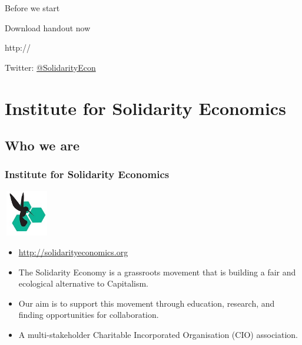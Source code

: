 \begin{frame}{Before we start}
  \begin{center}
    Download handout now

    http://

    Twitter: \href{https://twitter.com/SolidarityEcon}{@SolidarityEcon}
  \end{center}
\end{frame}
\frame{\titlepage}

\frame{\tableofcontents}

\section{Institute for Solidarity Economics}
\subsection{Who we are}
\frame
{
  \frametitle{Institute for Solidarity Economics}
  \begin{center}
    \includegraphics[height=2cm,width=2cm]{ise-logo.jpg}
  \end{center}
  \begin{itemize}
    \item<1-> \url{http://solidarityeconomics.org}
    \item<1-> The Solidarity Economy is a grassroots movement that is building a fair and ecological alternative to Capitalism.
    \item<2-> Our aim is to support this movement through education, research, and finding opportunities for collaboration.
    \item<3-> A multi-stakeholder Charitable Incorporated Organisation (CIO) association.
  \end{itemize}
}
